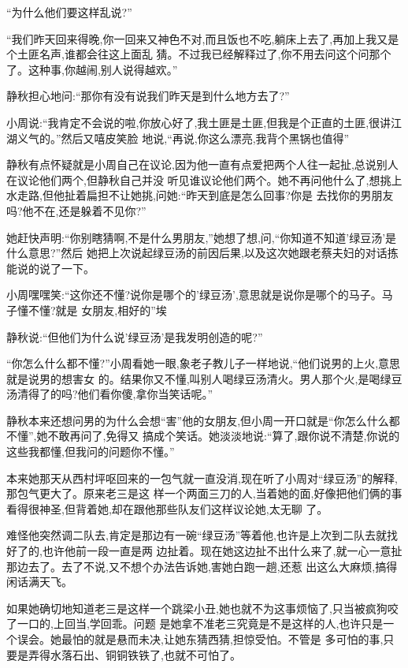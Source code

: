 ﻿\documentclass[12pt]{article}
\begin{document}
``为什么他们要这样乱说?''

``我们昨天回来得晚,你一回来又神色不对,而且饭也不吃,躺床上去了,再加上我又是个土匪名声,谁都会往这上面乱
猜。不过我已经解释过了,你不用去问这个问那个了。这种事,你越闹,别人说得越欢。''

静秋担心地问:``那你\myrule 有没有说\myrule 我们昨天是到\myrule 什么地方去了?''


小周说:``我肯定不会说的啦,你放心好了,我土匪是土匪,但我是个正直的土匪,很讲江湖义气的。''然后又嘻皮笑脸
地说,``再说,你\myrule 这么漂亮,我背个黑锅也值得\myrule ''

静秋有点怀疑就是小周自己在议论,因为他一直有点爱把两个人往一起扯,总说别人在议论他们两个,但静秋自己并没
听见谁议论他们两个。她不再问他什么了,想挑上水走路,但他扯着扁担不让她挑,问她:``昨天到底是怎么回事?你是
去找你的男朋友吗?他\myrule 不在,还是躲着不见你?''

她赶快声明:``你别瞎猜啊,不是什么男朋友\myrule ,''她想了想,问,``你知道不知道'绿豆汤'是什么意思?''然后
她把上次说起绿豆汤的前因后果,以及这次她跟老蔡夫妇的对话拣能说的说了一下。

小周嘿嘿笑:``这你还不懂?说你是哪个的'绿豆汤',意思就是说你是哪个的\myrule 马子。马子懂不懂?就是
\myrule 女朋友,相好的\myrule ''埃

静秋说:``但他们为什么说'绿豆汤'是我发明创造的呢?''

``你怎么什么都不懂?''小周看她一眼,象老子教儿子一样地说,``他们说男的上火,意思就是说男的想\myrule 害女
的。结果你又不懂,叫别人喝绿豆汤清火。男人那个火,是喝绿豆汤清得了的吗?他们看你傻,拿你当笑话呢。''

静秋本来还想问男的为什么会想``害''他的女朋友,但小周一开口就是``你怎么什么都不懂'',她不敢再问了,免得又
搞成个笑话。她淡淡地说:``算了,跟你说不清楚,你说的这些我都懂,但我问的问题你不懂。''

本来她那天从西村坪呕回来的一包气就一直没消,现在听了小周对``绿豆汤''的解释,那包气更大了。原来老三是这
样一个两面三刀的人,当着她的面,好像把他们俩的事看得很神圣,但背着她,却在跟他那些队友们这样议论她,太无聊
了。

难怪他突然调二队去,肯定是那边有一碗``绿豆汤''等着他,也许是上次到二队去就找好了的,也许他前一段一直是两
边扯着。现在她这边扯不出什么来了,就一心一意扯那边去了。去了不说,又不想个办法告诉她,害她白跑一趟,还惹
出这么大麻烦,搞得闲话满天飞。

如果她确切地知道老三是这样一个跳梁小丑,她也就不为这事烦恼了,只当被疯狗咬了一口的,上回当,学回乖。问题
是她拿不准老三究竟是不是这样的人,也许只是一个误会。她最怕的就是悬而未决,让她东猜西猜,担惊受怕。不管是
多可怕的事,只要是弄得水落石出、铜铜铁铁了,也就不可怕了。
\end{document}
